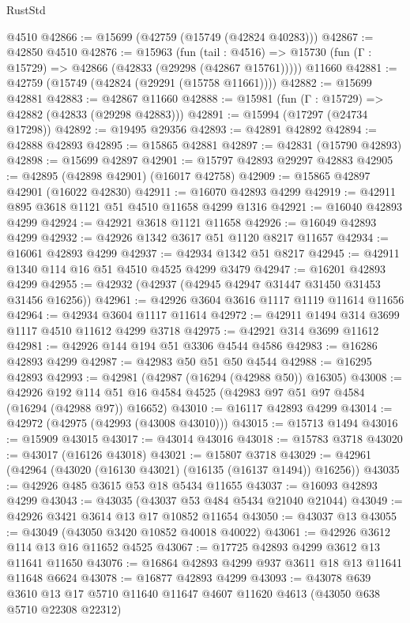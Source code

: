 \begin{lexlean}{RustStd}
\begin{coremodule}
    @4510
@42866 := @15699 (@42759 (@15749 (@42824 @40283)))
@42867 := @42850 @4510
@42876 := @15963
    (fun (tail : @4516) => @15730 (fun (Γ : @15729) => @42866 (@42833 (@29298 (@42867 @15761)))))
    @11660
@42881 := @42759 (@15749 (@42824 (@29291 (@15758 @11661))))
@42882 := @15699 @42881
@42883 := @42867 @11660
@42888 := @15981 (fun (Γ : @15729) => @42882 (@42833 (@29298 @42883)))
@42891 := @15994 (@17297 (@24734 @17298))
@42892 := @19495 @29356
@42893 := @42891 @42892
@42894 := @42888 @42893
@42895 := @15865 @42881
@42897 := @42831 (@15790 @42893)
@42898 := @15699 @42897
@42901 := @15797 @42893 @29297 @42883
@42905 := @42895 (@42898 @42901) (@16017 @42758)
@42909 := @15865 @42897 @42901 (@16022 @42830)
@42911 := @16070 @42893 @4299
@42919 := @42911 @895 @3618 @1121 @51 @4510 @11658 @4299 @1316
@42921 := @16040 @42893 @4299
@42924 := @42921 @3618 @1121 @11658
@42926 := @16049 @42893 @4299
@42932 := @42926 @1342 @3617 @51 @1120 @8217 @11657
@42934 := @16061 @42893 @4299
@42937 := @42934 @1342 @51 @8217
@42945 := @42911 @1340 @114 @16 @51 @4510 @4525 @4299 @3479
@42947 := @16201 @42893 @4299
@42955 := @42932 (@42937 (@42945 @42947 @31447 @31450 @31453 @31456 @16256))
@42961 := @42926 @3604 @3616 @1117 @1119 @11614 @11656
@42964 := @42934 @3604 @1117 @11614
@42972 := @42911 @1494 @314 @3699 @1117 @4510 @11612 @4299 @3718
@42975 := @42921 @314 @3699 @11612
@42981 := @42926 @144 @194 @51 @3306 @4544 @4586
@42983 := @16286 @42893 @4299
@42987 := @42983 @50 @51 @50 @4544
@42988 := @16295 @42893
@42993 := @42981 (@42987 (@16294 (@42988 @50)) @16305)
@43008 := @42926
    @192
    @114
    @51
    @16
    @4584
    @4525
    (@42983 @97 @51 @97 @4584 (@16294 (@42988 @97)) @16652)
@43010 := @16117 @42893 @4299
@43014 := @42972 (@42975 (@42993 (@43008 @43010)))
@43015 := @15713 @1494
@43016 := @15909 @43015
@43017 := @43014 @43016
@43018 := @15783 @3718
@43020 := @43017 (@16126 @43018)
@43021 := @15807 @3718
@43029 := @42961 (@42964 (@43020 (@16130 @43021) (@16135 (@16137 @1494)) @16256))
@43035 := @42926 @485 @3615 @53 @18 @5434 @11655
@43037 := @16093 @42893 @4299
@43043 := @43035 (@43037 @53 @484 @5434 @21040 @21044)
@43049 := @42926 @3421 @3614 @13 @17 @10852 @11654
@43050 := @43037 @13
@43055 := @43049 (@43050 @3420 @10852 @40018 @40022)
@43061 := @42926 @3612 @114 @13 @16 @11652 @4525
@43067 := @17725 @42893 @4299 @3612 @13 @11641 @11650
@43076 := @16864 @42893 @4299 @937 @3611 @18 @13 @11641 @11648 @6624
@43078 := @16877 @42893 @4299
@43093 := @43078
    @639
    @3610
    @13
    @17
    @5710
    @11640
    @11647
    @4607
    @11620
    @4613
    (@43050 @638 @5710 @22308 @22312)

\end{coremodule}
\end{lexlean}
